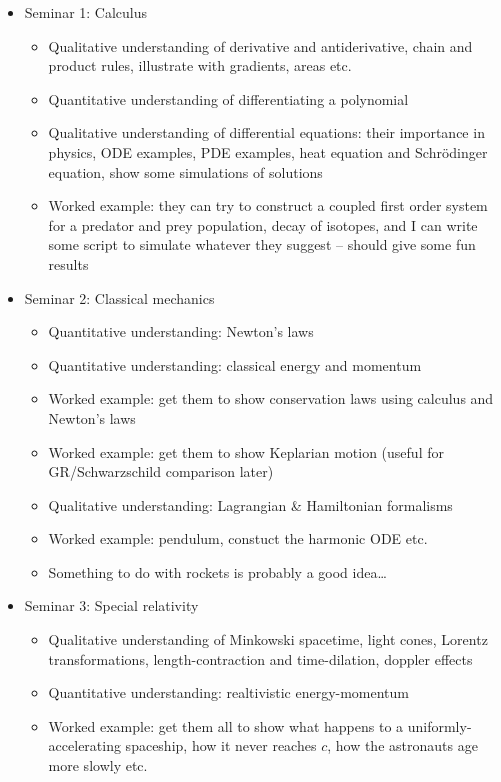 \documentclass{article}
\begin{document}
\begin{itemize}
  \item Seminar 1: Calculus
    \begin{itemize}
      \item Qualitative understanding of derivative and antiderivative, chain and product rules, illustrate with gradients, areas etc.
      \item Quantitative understanding of differentiating a polynomial
      \item Qualitative understanding of differential equations: their importance in physics, ODE examples, PDE examples, heat equation and Schr\"odinger equation, show some simulations of solutions
      \item Worked example: they can try to construct a coupled first order system for a predator and prey population, decay of isotopes, and I can write some script to simulate whatever they suggest -- should give some fun results
    \end{itemize}
  \item Seminar 2: Classical mechanics
    \begin{itemize}
      \item Quantitative understanding: Newton's laws
      \item Quantitative understanding: classical energy and momentum
      \item Worked example: get them to show conservation laws using calculus and Newton's laws
      \item Worked example: get them to show Keplarian motion (useful for GR/Schwarzschild comparison later)
      \item Qualitative understanding: Lagrangian \& Hamiltonian formalisms
      \item Worked example: pendulum, constuct the harmonic ODE etc.
      \item Something to do with rockets is probably a good idea\ldots
    \end{itemize}
  \item Seminar 3: Special relativity
    \begin{itemize}
      \item Qualitative understanding of Minkowski spacetime, light cones, Lorentz transformations, length-contraction and time-dilation, doppler effects
      \item Quantitative understanding: realtivistic energy-momentum
      \item Worked example: get them all to show what happens to a uniformly-accelerating spaceship, how it never reaches $c$, how the astronauts age more slowly etc.

\end{itemize}
\end{itemize}
\end{document}
